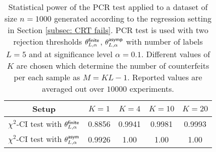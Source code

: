 \documentclass[11pt]{article}
\newcommand{\indep}{\perp \!\!\! \perp}
\begin{document}
\begin{table}
\begin{center}
\begin{tabular} {|c|c|c|c|c|}
	\hline
	  Setup         & $K=1$  & $K=4$ & $K=10$ & $K=20$ \\   \hline
 $\chi^2$-CI test with $\theta^{\mathsf{finite}}_{L,\alpha}$&0.8856 &   0.9941 &0.9981&0.9993 \\\hline 
$\chi^2$-CI test with $\theta^{\mathsf{asym}}_{L,\alpha}$&0.9926 &  1.00 &1.00& 1.00 \\ \hline
	\end{tabular}
\end{center}
\caption{Statistical power of the PCR test applied to a dataset of size $n=1000$ generated according to the regression setting in Section \ref {subsec: CRT fails}.  PCR test is used with two rejection thresholds $\theta_{L,\alpha}^{\mathsf{finite}}$, $\theta_{L,\alpha}^{\mathsf{asymp}}$ with number of labels $L=5$ and at significance level $\alpha=0.1$. Different values of $K$ are chosen which determine the number of counterfeits per each sample as $M=KL-1$. Reported values are averaged out over $10000$ experiments. }\label{table: pearson-example}
\end{table}

%
 
 
 \iffalse
 We start by proposing some regularity assumptions on score function $T$. First, suppose each data point $(X_i,Y_i,Z_i)$ is generated independently from a density function $q(x,z,y)$ with the following decomposition: $q(x,z,y)=p_{Z}(z)p_{X|Z}(x|z)p_{Y|XZ}(y|xz)$. Further, define $p(x,z,y):=p_{Z}(z)p_{X|Z}(x|z)p_{Y|Z}(y|z)$ with 
$$p_{Y|Z}(y|z):=\int p_{Y|XZ}(y|x,z)p_{X|Z}(x|z)\nu(dx)\,,$$
for a common measure $\nu(.)$. It is easy to observe that, for $(X,Z,Y)$ coming from the density function $p(.)$, we have $X \indep Y|Z$. 
\fi
\end{document}
